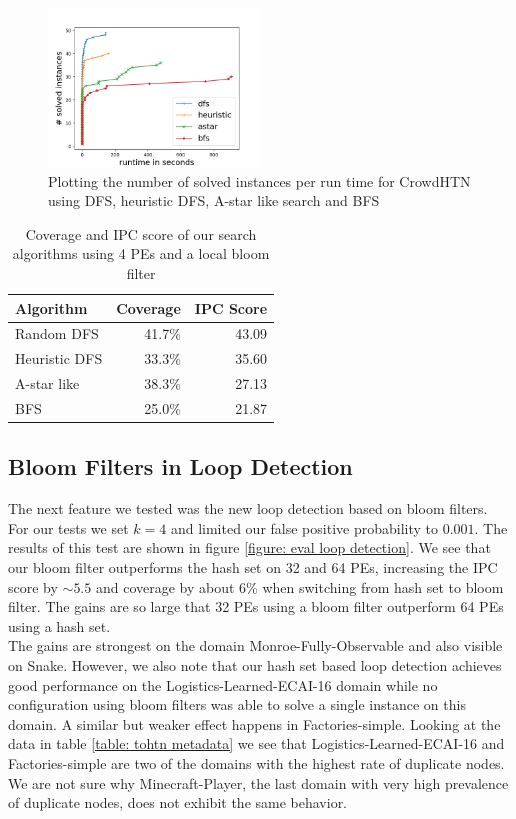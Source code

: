 \begin{figure}[!hbp]
	\caption{Plotting the number of solved instances per run time for CrowdHTN using DFS, heuristic DFS, A-star like search and BFS}
	\label{figure: eval algorithm}
	\centering
	\includegraphics[width=0.5\textwidth]{images/final/search_algorithms.png}
\end{figure}
\begin{table}[!hbp]
	\caption{Coverage and IPC score of our search algorithms using 4 PEs and a local bloom filter}
	\label{table: eval algorithm}
	\centering
	\begin{tabular}{| l | r | r |}
		\hline
		Algorithm 		& Coverage & IPC Score \\
		\hline
		Random DFS 		& 41.7\%	& 43.09 \\ %
		Heuristic DFS 	& 33.3\%	& 35.60	\\ %
		A-star like 	& 38.3\%	& 27.13 \\ %
		BFS 			& 25.0\%	& 21.87	\\ %
		\hline
	\end{tabular}
\end{table}

\subsection{Bloom Filters in Loop Detection}
\label{eval: loop detection}
The next feature we tested was the new loop detection based on bloom filters. For our tests we set $k=4$ and limited our false positive probability to $0.001$. The results of this test are shown in figure \ref{figure: eval loop detection}. We see that our bloom filter outperforms the hash set on 32 and 64 PEs, increasing the IPC score by $\sim 5.5$ and coverage by about 6\% when switching from hash set to bloom filter. The gains are so large that 32 PEs using a bloom filter outperform 64 PEs using a hash set. \\
The gains are strongest on the domain Monroe-Fully-Observable and also visible on Snake.
However, we also note that our hash set based loop detection achieves good performance on the Logistics-Learned-ECAI-16 domain while no configuration using bloom filters was able to solve a single instance on this domain. A similar but weaker effect happens in Factories-simple.
Looking at the data in table \ref{table: tohtn metadata} we see that Logistics-Learned-ECAI-16 and Factories-simple are two of the domains with the highest rate of duplicate nodes. We are not sure why Minecraft-Player, the last domain with very high prevalence of duplicate nodes, does not exhibit the same behavior.

